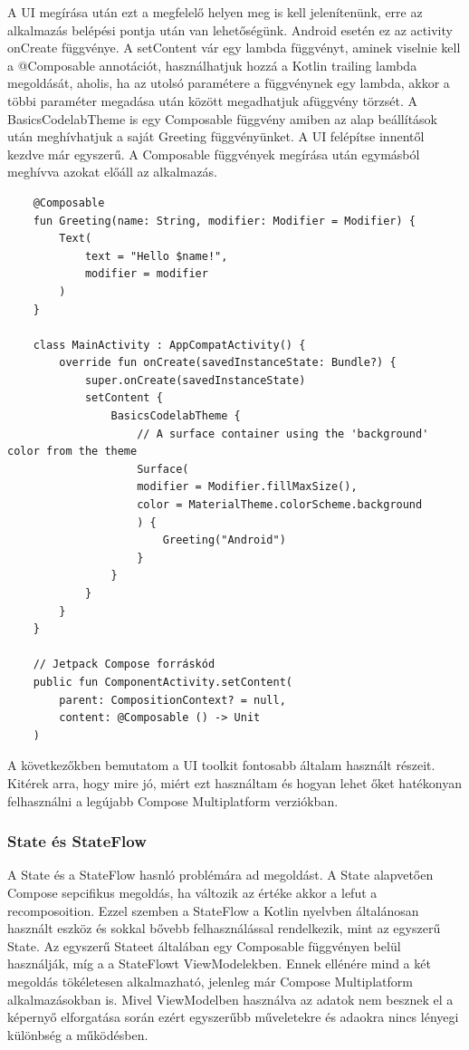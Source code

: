 A UI megírása után ezt a megfelelő helyen meg is kell jelenítenünk, erre az alkalmazás belépési pontja után van lehetőségünk.
Android esetén ez az activity onCreate függvénye.
A setContent vár egy lambda függvényt, aminek viselnie kell a @Composable annotációt, használhatjuk hozzá a Kotlin trailing lambda megoldását, aholis, ha az utolsó paramétere a függvénynek egy lambda, akkor a többi paraméter megadása után {} között megadhatjuk afüggvény törzsét.
A BasicsCodelabTheme is egy Composable függvény amiben az alap beállítások után meghívhatjuk a saját Greeting függvényünket.
A UI felépítse innentől kezdve már egyszerű.
A Composable függvények megírása után egymásból meghívva azokat előáll az alkalmazás.

\begin{lstlisting}
    @Composable
    fun Greeting(name: String, modifier: Modifier = Modifier) {
        Text(
            text = "Hello $name!",
            modifier = modifier
        )
    }

    class MainActivity : AppCompatActivity() {
        override fun onCreate(savedInstanceState: Bundle?) {
            super.onCreate(savedInstanceState)
            setContent {
                BasicsCodelabTheme {
                    // A surface container using the 'background' color from the theme
                    Surface(
                    modifier = Modifier.fillMaxSize(),
                    color = MaterialTheme.colorScheme.background
                    ) {
                        Greeting("Android")
                    }
                }
            }
        }
    }

    // Jetpack Compose forráskód
    public fun ComponentActivity.setContent(
        parent: CompositionContext? = null,
        content: @Composable () -> Unit
    )
\end{lstlisting}

A következőkben bemutatom a UI toolkit fontosabb általam használt részeit.
Kitérek arra, hogy mire jó, miért ezt használtam és hogyan lehet őket hatékonyan felhasználni a legújabb Compose Multiplatform verziókban.

\subsubsection{State és StateFlow}
A State és a StateFlow hasnló problémára ad megoldást.
A State alapvetően Compose sepcifikus megoldás, ha változik az értéke akkor a lefut a recomposoition.
Ezzel szemben a StateFlow a Kotlin nyelvben általánosan használt eszköz és sokkal bővebb felhasználással rendelkezik, mint az egyszerű State.
Az egyszerű Stateet általában egy Composable függvényen belül használják, míg a a StateFlowt ViewModelekben.
Ennek ellénére mind a két megoldás tökéletesen alkalmazható, jelenleg már Compose Multiplatform alkalmazásokban is.
Mivel ViewModelben használva az adatok nem besznek el a képernyő elforgatása során ezért egyszerűbb műveletekre és adaokra nincs lényegi különbség a működésben. 


